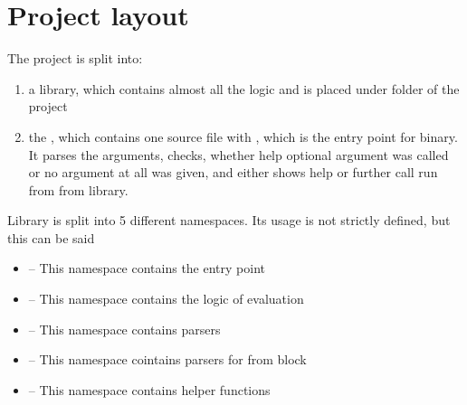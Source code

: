 \section{Project layout}

The project is split into:
\begin{enumerate}
  \item a library, which contains almost all the logic and is placed under
        folder of the project

  \item the , which contains one source file
      with , which is the entry point for  binary. 
      It parses the arguments, checks, whether help optional argument was called or no argument at all was given, 
      and either shows help or further call run from  from library.
\end{enumerate}

Library is split into 5 different namespaces. Its usage is not strictly defined, but this can be said
\begin{itemize}
    \item {} -- This namespace contains the entry point
    \item {} -- This namespace contains the logic of evaluation
    \item {} -- This namespace contains parsers
    \item {} -- This namespace cointains parsers for from block
    \item {} -- This namespace contains helper functions
\end{itemize}

